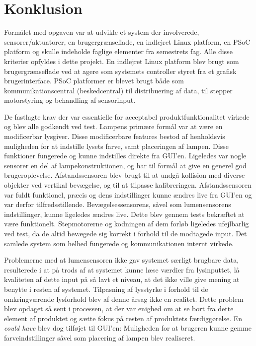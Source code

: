 \chapter{Konklusion}

Formålet med opgaven var at udvikle et system der involverede, sensorer/aktuatorer, en brugergrænseflade, en indlejret Linux platform, en PSoC platform og skulle indeholde faglige elementer fra semestrets fag. Alle disse kriterier opfyldes i dette projekt. En indlejret Linux platform blev brugt som brugergrænseflade ved at agere som systemets controller styret fra et grafisk brugerinterface. PSoC platformer er blevet brugt både som kommunikationscentral (beskedcentral) til distribuering af data, til stepper motorstyring og behandling af sensorinput.


De fastlagte krav der var essentielle for acceptabel produktfunktionalitet virkede og blev alle godkendt ved test. Lampens primære formål var at være en modificerbar lysgiver. Disse modificerbare features bestod af henholdsvis muligheden for at indstille lysets farve, samt placeringen af lampen. Disse funktioner fungerede og kunne indstilles direkte fra GUI’en. 
Ligeledes var nogle sensorer en del af lampekonstruktionen, og har til formål at give en generel god brugeroplevelse. Afstandssensoren blev brugt til at undgå kollision med diverse objekter ved vertikal bevægelse, og til at tilpasse kalibreringen. Afstandssensoren var fuldt funktionel, præcis og dens indstillinger kunne ændres live fra GUI’en og var derfor tilfredsstillende. 
Bevægelsessensorens, såvel som lumensensorens indstillinger, kunne ligeledes ændres live. Dette blev gennem tests bekræftet at være funktionelt. Stepmotorerne og kodningen af dem forløb ligeledes ufejlbarlig ved test, da de altid bevægede sig korrekt i forhold til de modtagede input. Det samlede system som helhed fungerede og kommunikationen internt virkede.


Problemerne med at lumensensoren ikke gav systemet særligt brugbare data, resulterede i at på trods af at systemet kunne læse værdier fra lysinputtet, lå kvaliteten af dette input på så lavt et niveau, at det ikke ville give mening at benytte i resten af systemet. Tilpasning af lysstyrke i forhold til de omkringværende lysforhold blev af denne årsag ikke en realitet. Dette problem blev opdaget så sent i processen, at der var enighed om at se bort fra dette element af produktet og sætte fokus på resten af produktets færdiggørelse.
En \textit{could have} blev dog tilføjet til GUI’en: Muligheden for at brugeren kunne gemme farveindstillinger såvel som placering af lampen blev realiseret.
